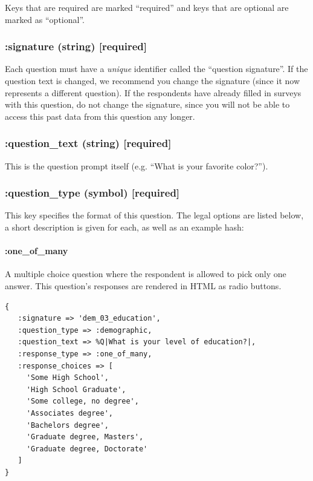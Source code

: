 \documentclass[12pt]{article}
\begin{document}
Keys that are required are marked ``required'' and keys that are optional are marked as ``optional''.


\subsubsection{:signature (string) [required]}

Each question must have a \textit{unique} identifier called the ``question signature''. If the question text is changed, we recommend you change the signature (since it now represents a different question). If the respondents have already filled in surveys with this question, do not change the signature, since you will not be able to access this past data from this question any longer.

%

\subsubsection{:question\_text (string) [required]}

This is the question prompt itself (e.g. ``What is your favorite color?''). 

\subsubsection{:question\_type (symbol) [required]}\label{subsubsec:question_type}

This key specifies the format of this question. The legal options are listed below, a short description is given for each, as well as an example hash:


\paragraph{:one\_of\_many}

A multiple choice question where the respondent is allowed to pick only one answer. This question's responses are rendered in HTML as radio buttons.

\begin{verbatim}
{
   :signature => 'dem_03_education',
   :question_type => :demographic,
   :question_text => %Q|What is your level of education?|,
   :response_type => :one_of_many,
   :response_choices => [
     'Some High School',
     'High School Graduate',
     'Some college, no degree',
     'Associates degree',
     'Bachelors degree',
     'Graduate degree, Masters',
     'Graduate degree, Doctorate'
   ]
}
\end{verbatim}
\end{document}
